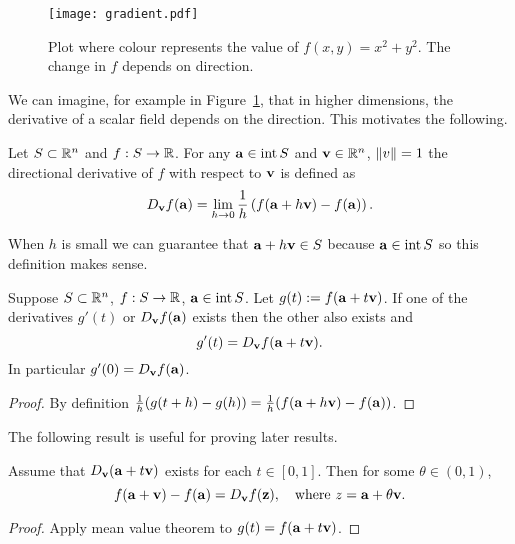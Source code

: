 \begin{figure}
    \begin{center}
        \texttt{[image: gradient.pdf]}
        \caption{Plot where colour represents the value of \(f(x,y)=x^2 + y^2\). The change in \(f\) depends on direction.}%
        \label{fig:directional}
    \end{center}
\end{figure}

We can imagine, for example in Figure~\ref{fig:directional}, that in higher dimensions, the derivative of a scalar field depends on the direction.
This motivates the following.

\begin{definition}
    Let \(S\subset \bR^n\) and \(f:S\to \bR\).
    For any \(\aa \in \operatorname{int}S\) and \(\vv \in \bR^n\), \(\norm{v}=1\) the directional derivative of \(f\) with respect to \(\vv\) is defined as
    \[
        D_{\vv}f(\aa) =
        \lim_{h\to 0} \frac{1}{h}\left(  f(\aa+h \vv) - f(\aa)     \right).
    \]
\end{definition}


When \(h\) is small we can guarantee that \(\aa + h \vv \in S\) because \(\aa\in \operatorname{int} S\) so this definition makes sense.


\begin{theorem*}
    Suppose \(S\subset \bR^n\), \(f:S\to \bR\), \(\aa \in \operatorname{int} S\).
    Let \(g(t) := f(\aa + t\vv)\).
    If one of the derivatives \(g'(t)\) or \(D_\vv f(\aa)\) exists then the other also exists and
    \[
        g'(t) = D_{\vv}f(\aa+t \vv).
    \]
    In particular \(g'(0) = D_{\vv}f(\aa)\).
\end{theorem*}

\begin{proof}
    By definition \(\frac{1}{h}(g(t+h)-g(h)) =\frac{1}{h}(f(\aa+h \vv) - f(\aa)) \).
\end{proof}

The following result is useful for proving later results.

\begin{theorem*}
    Assume that \(D_{\vv}(\aa+t\vv)\)  exists for each \(t\in [0,1]\). Then for some \(\theta \in (0,1)\),
    \[
        f(\aa+\vv) - f(\aa) = D_{\vv}f (\zz),
        \quad
        \text{where \(z=\aa + \theta \vv\)}.
    \]
\end{theorem*}

\begin{proof}
    Apply mean value theorem to \(g(t) = f(\aa+t\vv)\).
\end{proof}


